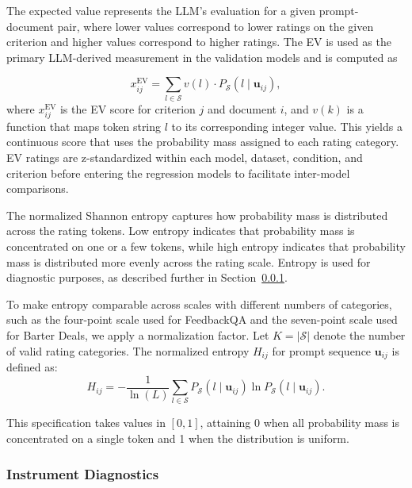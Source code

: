 The expected value represents the LLM's evaluation for a given prompt-document pair, where lower values correspond to lower ratings on the given criterion and higher values correspond to higher ratings. The EV is used as the primary LLM-derived measurement in the validation models and is computed as

\begin{equation}\label{eq:weighted_score}
x_{ij}^{\text{EV}} = \sum_{l \in \mathcal{S}} v(l) \cdot P_{\mathcal{S}}(l \mid \mathbf{u}_{ij}),
\end{equation}
where $x_{ij}^{\text{EV}}$ is the EV score for criterion $j$ and document $i$, and $v(k)$ is a function that maps token string $l$ to its corresponding integer value. This yields a continuous score that uses the probability mass assigned to each rating category. EV ratings are z-standardized within each model, dataset, condition, and criterion before entering the regression models to facilitate inter-model comparisons.

The normalized Shannon entropy captures how probability mass is distributed across the rating tokens. Low entropy indicates that probability mass is concentrated on one or a few tokens, while high entropy indicates that probability mass is distributed more evenly across the rating scale. Entropy is used for diagnostic purposes, as described further in Section~\ref{sec:methods_instrument_diag}.

To make entropy comparable across scales with different numbers of categories, such as the four-point scale used for FeedbackQA and the seven-point scale used for Barter Deals, we apply a normalization factor. Let $K = |\mathcal{S}|$ denote the number of valid rating categories. The normalized entropy $H_{ij}$ for prompt sequence $\mathbf{u}_{ij}$ is defined as:
\begin{equation}\label{eq:normalized_entropy}
H_{ij} = - \frac{1}{\ln(L)} \sum_{l \in \mathcal{S}} P_{\mathcal{S}}(l \mid \mathbf{u}_{ij}) \ln P_{\mathcal{S}}(l \mid \mathbf{u}_{ij}).
\end{equation}

This specification takes values in $[0,1]$, attaining 0 when all probability mass is concentrated on a single token and 1 when the distribution is uniform.


\subsubsection{Instrument Diagnostics}\label{sec:methods_instrument_diag}

